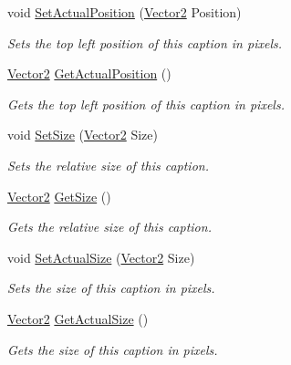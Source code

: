 \begin{DoxyCompactItemize}
void \hyperlink{classphys_1_1UI_1_1Caption_aa7cae65db2e068c47d42a0d12e259528}{SetActualPosition} (\hyperlink{classphys_1_1Vector2}{Vector2} Position)
\begin{DoxyCompactList}\small\item\em Sets the top left position of this caption in pixels. \item\end{DoxyCompactList}\item 
\hyperlink{classphys_1_1Vector2}{Vector2} \hyperlink{classphys_1_1UI_1_1Caption_aae3e6728a26111e12b081992d6d04e1a}{GetActualPosition} ()
\begin{DoxyCompactList}\small\item\em Gets the top left position of this caption in pixels. \item\end{DoxyCompactList}\item 
void \hyperlink{classphys_1_1UI_1_1Caption_a7a0ae7b6b82a9c0fba6c9a7ffb6d991b}{SetSize} (\hyperlink{classphys_1_1Vector2}{Vector2} Size)
\begin{DoxyCompactList}\small\item\em Sets the relative size of this caption. \item\end{DoxyCompactList}\item 
\hyperlink{classphys_1_1Vector2}{Vector2} \hyperlink{classphys_1_1UI_1_1Caption_a1da2e0e9ce0d904595f53a10244fcaf4}{GetSize} ()
\begin{DoxyCompactList}\small\item\em Gets the relative size of this caption. \item\end{DoxyCompactList}\item 
void \hyperlink{classphys_1_1UI_1_1Caption_a682a5d8b32d5382cbaba73bfe73128e3}{SetActualSize} (\hyperlink{classphys_1_1Vector2}{Vector2} Size)
\begin{DoxyCompactList}\small\item\em Sets the size of this caption in pixels. \item\end{DoxyCompactList}\item 
\hyperlink{classphys_1_1Vector2}{Vector2} \hyperlink{classphys_1_1UI_1_1Caption_aa80a4328d76458a6e869c485bea48b98}{GetActualSize} ()
\begin{DoxyCompactList}\small\item\em Gets the size of this caption in pixels. \item\end{DoxyCompactList}\item 

\end{DoxyCompactItemize}
